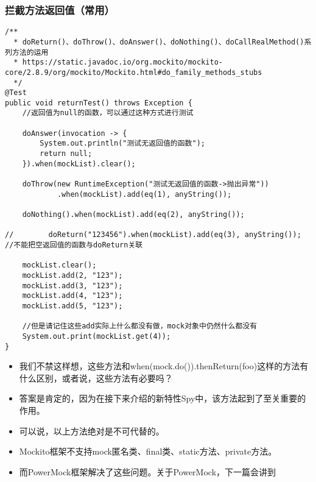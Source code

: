 \documentclass[9pt, b5paper]{article}
\begin{document}
\subsubsection{拦截方法返回值（常用）}
\label{sec-1-1-13}
\begin{verbatim}
/**
  * doReturn()、doThrow()、doAnswer()、doNothing()、doCallRealMethod()系列方法的运用
  * https://static.javadoc.io/org.mockito/mockito-core/2.8.9/org/mockito/Mockito.html#do_family_methods_stubs
  */
@Test
public void returnTest() throws Exception {
    //返回值为null的函数，可以通过这种方式进行测试

    doAnswer(invocation -> {
        System.out.println("测试无返回值的函数");
        return null;
    }).when(mockList).clear();

    doThrow(new RuntimeException("测试无返回值的函数->抛出异常"))
            .when(mockList).add(eq(1), anyString());

    doNothing().when(mockList).add(eq(2), anyString());

//        doReturn("123456").when(mockList).add(eq(3), anyString());    //不能把空返回值的函数与doReturn关联

    mockList.clear();
    mockList.add(2, "123");
    mockList.add(3, "123");
    mockList.add(4, "123");
    mockList.add(5, "123");

    //但是请记住这些add实际上什么都没有做，mock对象中仍然什么都没有
    System.out.print(mockList.get(4));
}
\end{verbatim}
\begin{itemize}
\item 我们不禁这样想，这些方法和when(mock.do()).thenReturn(foo)这样的方法有什么区别，或者说，这些方法有必要吗？
\item 答案是肯定的，因为在接下来介绍的新特性Spy中，该方法起到了至关重要的作用。
\item 可以说，以上方法绝对是不可代替的。
\item Mockito框架不支持mock匿名类、final类、static方法、private方法。
\item 而PowerMock框架解决了这些问题。关于PowerMock，下一篇会讲到
\end{itemize}
\end{document}
